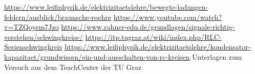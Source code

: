 \documentclass{article}
\begin{document}




%

%


%


\begin{thebibliography}{9}
 \url{https://www.leifiphysik.de/elektrizitaetslehre/bewegte-ladungen-feldern/ausblick/braunsche-roehre}
 \url{https://www.youtube.com/watch?v=TZQoyem7Jzo}
 \url{https://www.rahner-edu.de/grundlagen/signale-richtig-verstehen/schwingkreise/}
 \url{https://itp.tugraz.at/wiki/index.php/RLC-Serienschwingkreis}
 \url{https://www.leifiphysik.de/elektrizitaetslehre/kondensator-kapazitaet/grundwissen/ein-und-ausschalten-von-rc-kreisen}
 Unterlagen zum Versuch aus dem TeachCenter der TU Graz

\end{thebibliography}
\end{document}

